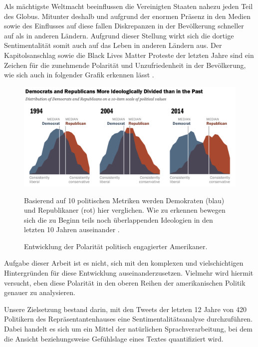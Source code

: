 Als mächtigste Weltmacht beeinflussen die Vereinigten Staaten nahezu jeden Teil des Globus. Mitunter deshalb und aufgrund der enormen Präsenz in den Medien sowie des Einflusses auf diese fallen Diskrepanzen in der Bevölkerung schneller auf als in anderen Ländern. Aufgrund dieser Stellung wirkt sich die dortige Sentimentalität somit auch auf das Leben in anderen Ländern aus. Der Kapitolsanschlag sowie die Black Lives Matter Proteste der letzten Jahre sind ein Zeichen für die zunehmende Polarität und Unzufriedenheit in der Bevölkerung, wie sich auch in folgender Grafik erkennen lässt \label{polPolar} .

\begin{figure}[ht]
	\centering
	\includegraphics[width=1\textwidth]{images/Kapitel1/PoliticalPolarization}
	\caption{\label{fig:polPolar}Entwicklung der Polarität politisch engagierter Amerikaner.}{Basierend auf 10 politischen Metriken werden Demokraten (blau) und Republikaner (rot) hier verglichen. Wie zu erkennen bewegen sich die zu Beginn teils noch überlappenden Ideologien in den letzten 10 Jahren auseinander \protect{}.}
\end{figure}

Aufgabe dieser Arbeit ist es nicht, sich mit den komplexen und vielschichtigen Hintergründen für diese Entwicklung auseinanderzusetzen. Vielmehr wird hiermit versucht, eben diese Polarität in den oberen Reihen der amerikanischen Politik genauer zu analysieren.

Unsere Zielsetzung bestand darin, mit den Tweets der letzten 12 Jahre von 420 Politikern des Repräsentantenhauses eine Sentimentalitätsanalyse durchzuführen. Dabei handelt es sich um ein Mittel der natürlichen Sprachverarbeitung, bei dem die Ansicht beziehungsweise Gefühlslage eines Textes quantifiziert wird.